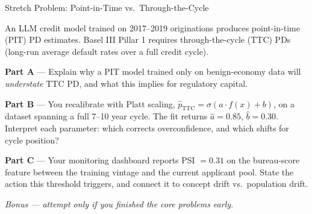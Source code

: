 \documentclass[9pt,t]{beamer}
\begin{document}

\begin{frame}[noframenumbering]{Stretch Problem: Point-in-Time vs.\ Through-the-Cycle}

An LLM credit model trained on 2017--2019 originations produces point-in-time (PIT) PD
estimates. Basel III Pillar 1 requires through-the-cycle (TTC) PDs (long-run average
default rates over a full credit cycle).

\medskip
\textbf{Part A} --- Explain why a PIT model trained only on benign-economy data will
\emph{understate} TTC PD, and what this implies for regulatory capital.

\medskip
\textbf{Part B} --- You recalibrate with Platt scaling, $\hat{p}_{\text{TTC}} = \sigma(a \cdot f(x) + b)$,
on a dataset spanning a full 7--10 year cycle. The fit returns $\hat{a} = 0.85$, $\hat{b} = 0.30$.
Interpret each parameter: which corrects overconfidence, and which shifts for cycle position?

\medskip
\textbf{Part C} --- Your monitoring dashboard reports PSI $= 0.31$ on the bureau-score
feature between the training vintage and the current applicant pool. State the action this
threshold triggers, and connect it to concept drift vs.\ population drift.

\medskip
\begin{center}
\small\textit{Bonus --- attempt only if you finished the core problems early.}
\end{center}
\end{frame}
\end{document}
